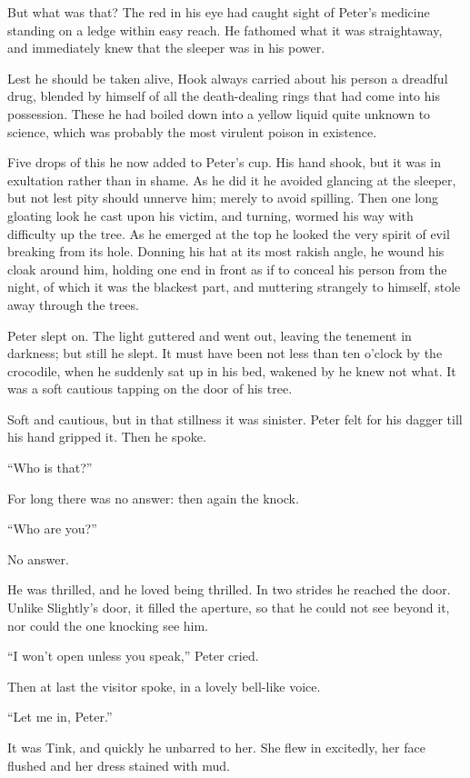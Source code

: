 But what was that? The red in his eye had caught sight of Peter's
medicine standing on a ledge within easy reach. He fathomed what it was
straightaway, and immediately knew that the sleeper was in his power.

Lest he should be taken alive, Hook always carried about his person a
dreadful drug, blended by himself of all the death-dealing rings that
had come into his possession. These he had boiled down into a yellow
liquid quite unknown to science, which was probably the most virulent
poison in existence.

Five drops of this he now added to Peter's cup. His hand shook, but it
was in exultation rather than in shame. As he did it he avoided
glancing at the sleeper, but not lest pity should unnerve him; merely
to avoid spilling. Then one long gloating look he cast upon his victim,
and turning, wormed his way with difficulty up the tree. As he emerged
at the top he looked the very spirit of evil breaking from its hole.
Donning his hat at its most rakish angle, he wound his cloak around
him, holding one end in front as if to conceal his person from the
night, of which it was the blackest part, and muttering strangely to
himself, stole away through the trees.

Peter slept on. The light guttered and went out, leaving the tenement
in darkness; but still he slept. It must have been not less than ten
o'clock by the crocodile, when he suddenly sat up in his bed, wakened
by he knew not what. It was a soft cautious tapping on the door of his
tree.

Soft and cautious, but in that stillness it was sinister. Peter felt
for his dagger till his hand gripped it. Then he spoke.

``Who is that?''

For long there was no answer: then again the knock.

``Who are you?''

No answer.

He was thrilled, and he loved being thrilled. In two strides he reached
the door. Unlike Slightly's door, it filled the aperture, so that he
could not see beyond it, nor could the one knocking see him.

``I won't open unless you speak,'' Peter cried.

Then at last the visitor spoke, in a lovely bell-like voice.

``Let me in, Peter.''

It was Tink, and quickly he unbarred to her. She flew in excitedly, her
face flushed and her dress stained with mud.

